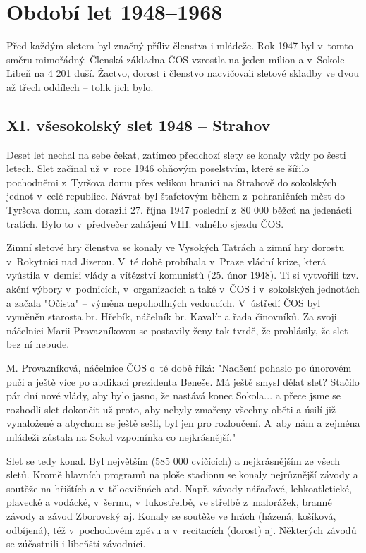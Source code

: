 \documentclass[a5paper, 11pt, twoside]{article}
\begin{document}
\section{Období let 1948--1968}

Před každým sletem byl značný příliv členstva i mládeže. Rok 1947 byl
v~tomto směru mimořádný. Členská základna ČOS vzrostla na jeden milion a
v~Sokole Libeň na 4 201 duší. Žactvo, dorost i členstvo nacvičovali
sletové skladby ve dvou až třech oddílech -- tolik jich bylo.

\subsection{XI. všesokolský slet 1948 -- Strahov}

Deset let nechal na sebe čekat, zatímco předchozí slety se konaly vždy
po šesti letech. Slet začínal už v~roce 1946 ohňovým poselstvím, které
se šířilo pochodněmi z~Tyršova domu přes velikou hranici na Strahově do
sokolských jednot v~celé republice. Návrat byl štafetovým během
z~pohraničních měst do Tyršova domu, kam dorazili 27. října 1947 poslední
z~80 000 běžců na jedenácti tratích. Bylo to v~předvečer zahájení VIII.
valného sjezdu ČOS.

Zimní sletové hry členstva se konaly ve Vysokých Tatrách a zimní hry
dorostu v~Rokytnici nad Jizerou. V~té době probíhala v~Praze vládní
krize, která vyústila v~demisi vlády a vítězství komunistů (25. únor
1948). Ti si vytvořili tzv. akční výbory v~podnicích, v~organizacích a
také v~ČOS i v~sokolských jednotách a začala "Očista" -- výměna
nepohodlných vedoucích. V~ústředí ČOS byl vyměněn starosta br. Hřebík,
náčelník br. Kavalír a řada činovníků. Za svoji náčelnici Marii
Provazníkovou se postavily ženy tak tvrdě, že prohlásily, že slet bez ní
nebude.

M. Provazníková, náčelnice ČOS o~té době říká: "Nadšení pohaslo po
únorovém puči a ještě více po abdikaci prezidenta Beneše. Má ještě smysl
dělat slet? Stačilo pár dní nové vlády, aby bylo jasno, že nastává konec
Sokola... a přece jsme se rozhodli slet dokončit už proto, aby nebyly
zmařeny všechny oběti a úsilí již vynaložené a abychom se ještě sešli,
byl jen pro rozloučení. A~aby nám a zejména mládeži zůstala na Sokol
vzpomínka co nejkrásnější."

Slet se tedy konal. Byl největším (585 000 cvičících) a nejkrásnějším ze
všech sletů. Kromě hlavních programů na ploše stadionu se konaly
nejrůznější závody a soutěže na hřištích a v~tělocvičnách atd. Např.
závody nářaďové, lehkoatletické, plavecké a vodácké, v~šermu,
v~lukostřelbě, ve střelbě z~malorážek, branné závody a závod Zborovský aj.
Konaly se soutěže ve hrách (házená, košíková, odbíjená), též
v~pochodovém zpěvu a v~recitacích (dorost) aj. Některých závodů se
zúčastnili i libeňští závodníci.
\end{document}
